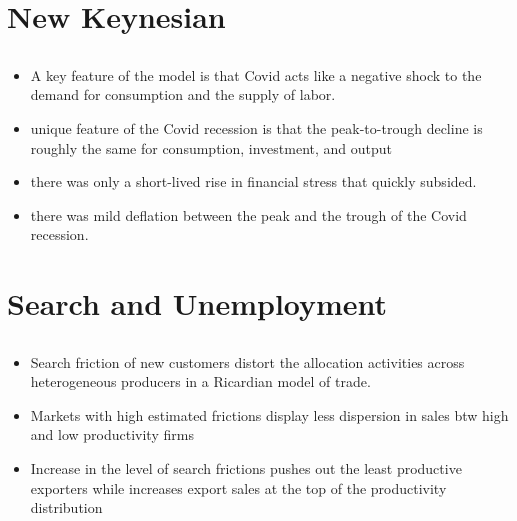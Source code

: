 \documentclass[10pt]{article} %
\begin{document}
\section{New Keynesian}
    \subsection{\cite{EichenbaumRebeloTrabandt2022}}
    \begin{itemize}
        \item A key feature of the model is that Covid acts like a negative shock to the demand for consumption and the supply of labor.
        \item  unique feature of the Covid recession is that the peak-to-trough decline is roughly the same for consumption, investment, and output
        \item there was only a short-lived rise in financial stress that quickly subsided.
        \item there was mild deflation between the peak and the trough of the Covid recession.
    \end{itemize}



\section{Search and Unemployment}
    \subsection{\cite{MortensenPissarides1994}}
    \subsection{\cite{Shimer2005}}

    \subsection{\cite{HornsteinKrusellViolante2011}}

    \subsection{\cite{LenoirMartinMejean2022}}
    \begin{itemize}
        \item Search friction of new customers distort the allocation activities across heterogeneous producers in a Ricardian model of trade.
        \item Markets with high estimated frictions display less dispersion in sales btw high and low productivity firms
        \item Increase in the level of search frictions pushes out the least productive exporters while increases export sales at the top of the productivity distribution
    \end{itemize}
\end{document}

